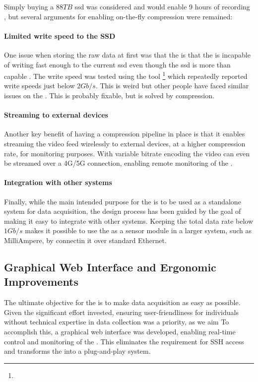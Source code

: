 Simply buying a 8$8TB$ \gls{ssd} was considered and  would enable 9 hours of recording \cite{CorsairMP600PRO}, but several arguments for enabling on-the-fly compression were remained:


\paragraph{Limited write speed to the SSD}
One issue when storing the raw data at first was that the \jx is that the \jx is incapable of writing fast enough to the current \gls{ssd} even though the \gls{ssd} is more than capable \cite{microntechnologyMicron2300SSD2020}.
The write speed was tested using the  tool
\footnote{}
which repeatedly reported write speeds just below $2Gb/s$.
This is weird but other people have faced similar issues on the \jx \cite{dtyuImbalancedPerformanceRead2018}.
This is probably fixable, but is solved by compression.

\paragraph{Streaming to external devices}
Another key benefit of having a compression pipeline in place is that it enables streaming the video feed wirelessly to external devices, at a higher compression rate, for monitoring purposes.
With variable bitrate encoding the video can even be streamed over a 4G/5G connection, enabling remote monitoring of the \sr.

\paragraph{Integration with other systems}
Finally, while the main intended purpose for the \sr is to be used as a standalone system for data acquisition, the design process has been guided by the goal of making it easy to integrate with other systems.
Keeping the total data rate below $1Gb/s$ makes it possible to use the \sr as a sensor module in a larger system, such as MilliAmpere, by connectin it over standard Ethernet.

\subsection{Graphical Web Interface and Ergonomic Improvements}
The ultimate objective for the \sr is to make data acquisition as easy as possible.
Given the significant effort invested, ensuring user-friendliness for individuals without technical expertise in data collection was a priority, as we aim
To accomplish this, a graphical web interface was developed, enabling real-time control and monitoring of the \sr.
This eliminates the requirement for SSH access and transforms the \sr into a plug-and-play system.

